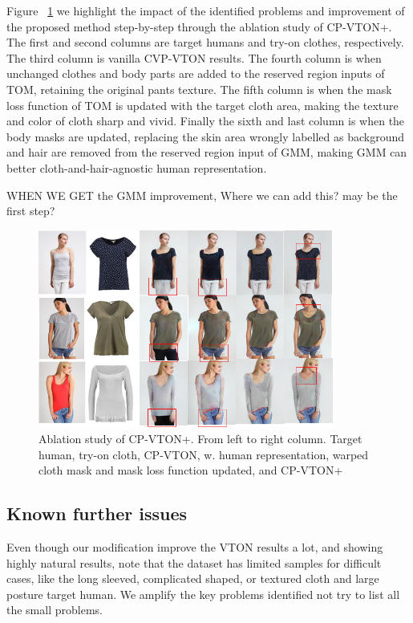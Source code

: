 Figure ~\ref{fig:ablation} we highlight the impact of the identified problems and improvement of the proposed method step-by-step through the ablation study of CP-VTON+. The first and second columns are target humans and try-on clothes, respectively. The third column is vanilla CVP-VTON results. The fourth column is when unchanged clothes and body parts are added to the reserved region inputs of TOM, retaining the original pants texture. The fifth column is when the mask loss function of TOM is updated with the target cloth area, making the texture and color of cloth sharp and vivid. Finally the sixth and last column is when the body masks are updated, replacing the skin area wrongly labelled as background and hair are removed from the reserved region input of GMM, making GMM can better cloth-and-hair-agnostic human representation.  


WHEN WE GET the GMM improvement, Where we can add this? may be the first step?

\begin{figure}
\centering
\includegraphics[height=6.5cm, scale=1]{figures/ablation.png} 
\caption{Ablation study of CP-VTON+. From left to right column. Target human, try-on cloth, CP-VTON, w. human representation, warped cloth mask and mask loss function updated, and CP-VTON+
}
\label{fig:ablation}
\end{figure}



\subsection{Known further issues}


Even though our modification  improve the VTON results a lot, and showing highly natural results, note that the dataset has limited samples for difficult cases, like the long sleeved, complicated shaped, or textured cloth and large posture target human. We amplify the key problems identified not try to list all the small problems. 

